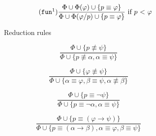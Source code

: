 \documentclass{article}
\theoremstyle{definition}
\newcommand*{\id}{\equiv}
\newcommand*{\ra}{\rightarrow}
\begin{document}
\begin{figure}
\begin{subfigure}{\textwidth}
\begin{subfigure}{0.4\textwidth}
\begin{equation}
            \end{equation}
        \end{subfigure}
        \begin{subfigure}{0.5\textwidth}
            \begin{equation}
                \tag{$\texttt{fun}^1$}
                \frac{
                    \Phi \cup \Phi(\varphi) \cup \{ p \equiv \varphi \} }%
                { \Phi \cup \Phi(\varphi / p) \cup \{p \equiv \varphi\} }
                \text{ if $p$ < $\varphi$}
            \end{equation}
        \end{subfigure}
        \caption{Reduction rules}
    \end{subfigure}
    \begin{subfigure}{\textwidth}
        \centering
        \begin{subfigure}{0.4\textwidth}
            \begin{equation}
                \tag{$\not \equiv_1$}
                \frac{
                    \Phi \cup \{ p \not \equiv \psi \} }%
                { \Phi \cup \{ p \not \equiv \alpha, \alpha \equiv \psi \} }
            \end{equation}
        \end{subfigure}
        \begin{subfigure}{0.4\textwidth}
            \begin{equation}
                \tag{$\not \eq_2$}
                \frac{
                    \Phi \cup \{ \varphi \not \id \psi \} }%
                { \Phi \cup \{ \alpha \id \varphi, \beta \id \psi, \alpha \not \id \beta \} }
            \end{equation}
        \end{subfigure}
        \begin{subfigure}{0.4\textwidth}
            \begin{equation}
                \tag{$\eq_\lnot$}
                \frac{
                    \Phi \cup \{ p \id \lnot \psi  \} }%
                { \Phi \cup \{ p \id \lnot \alpha, \alpha \id \psi \} }
            \end{equation}
        \end{subfigure}
        \begin{subfigure}{0.5\textwidth}
            \begin{equation}
                \tag{$ \eq_\ra $}
                \frac{
                    \Phi \cup \{ p \id (\varphi \ra \psi) \} }%
                { \Phi \cup \{ p \id (\alpha \ra \beta), \alpha \id \varphi, \beta \id \psi \} }

\end{equation}
\end{subfigure}
\end{subfigure}
\end{figure}
\end{document}
